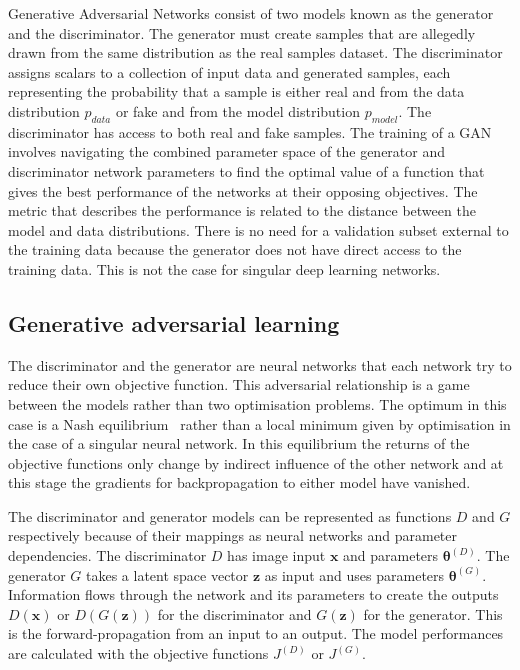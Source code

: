 \documentclass[twocolumn]{article}
\numberwithin{equation}{section}
\begin{document}
Generative Adversarial Networks consist of two models known as the generator and the discriminator. The generator must 
create samples that are allegedly drawn from the same distribution as the real samples dataset. The discriminator assigns 
scalars to a collection of input data and generated samples, each representing the probability that a sample is either real 
and from the data distribution $p_{data}$ or fake and from the model distribution  $p_{model}$. The discriminator has 
access to both real and fake samples. The training of a GAN involves navigating the combined parameter space of the 
generator and discriminator network parameters to find the optimal value of a function that gives the best performance of
the networks at their opposing objectives. The metric that describes the performance is related to the distance between 
the model and data distributions. There is no need for a validation subset external to the training data because the 
generator does not have direct access to the training data. This is not the case for singular deep learning networks.


\subsection{Generative adversarial learning}
The discriminator and the generator are neural networks that each network try to reduce their own objective function. 
This adversarial relationship is a game between the models rather than two optimisation problems. The optimum in this 
case is a Nash equilibrium~\cite{NIPS16} rather than a local minimum given by optimisation in the case of a singular 
neural network. In this equilibrium the returns of the objective functions only change by indirect influence of the 
other network and at this stage the gradients for backpropagation to either model have vanished.

The discriminator and generator models can be represented as functions $D$ and $G$ respectively because of their 
mappings as neural networks and parameter dependencies. The discriminator $D$ has image input $\mathbf{x}$ and parameters 
$\bm{\theta}^{(D)}$. The generator $G$ takes a latent space vector $\mathbf{z}$ as input and uses parameters 
$\bm{\theta}^{(G)}$. Information flows through the network and its parameters to create the outputs $D(\mathbf{x})$ or 
$D(G(\mathbf{z}))$ for the discriminator and $G(\mathbf{z})$ for the generator. This is the forward-propagation from 
an input to an output. The model performances are calculated with the objective functions $J^{(D)}$ or $J^{(G)}$. 
\end{document}
